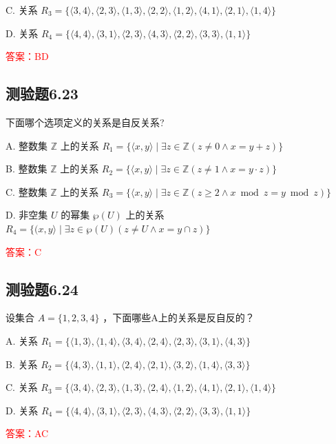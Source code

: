 \documentclass[UTF8, heading=true]{ctexart}
\begin{document}
C. 关系 $R_3=\{\langle 3,4\rangle,\langle 2,3\rangle,\langle 1,3\rangle,\langle 2,2\rangle,\langle 1,2\rangle,\langle 4,1\rangle,\langle 2,1\rangle,\langle 1,4\rangle\}$

D. 关系 $R_4=\{\langle 4,4\rangle,\langle 3,1\rangle,\langle 2,3\rangle,\langle 4,3\rangle,\langle 2,2\rangle,\langle 3,3\rangle,\langle 1,1\rangle\}$

\textcolor{red}{答案：BD}

\subsection{测验题6.23}
下面哪个选项定义的关系是自反关系?

A. 
整数集 $\mathbb{Z}$ 上的关系 $R_1=\{\langle x, y\rangle \mid \exists z \in \mathbb{Z}(z \neq 0 \wedge x=y+z)\}$

B. 
整数集 $\mathbb{Z}$ 上的关系 $R_2=\{\langle x, y\rangle \mid \exists z \in \mathbb{Z}(z \neq 1 \wedge x=y \cdot z)\}$

C. 
整数集 $\mathbb{Z}$ 上的关系 $R_3=\{\langle x, y\rangle \mid \exists z \in \mathbb{Z}(z \geq 2 \wedge x \bmod z=y \bmod z)\}$

D. 
非空集 $U$ 的幂集 $\wp(U)$ 上的关系 $R_4=\{(x, y\rangle \mid \exists z \in \wp(U)(z \neq U \wedge x=y \cap z)\}$

\textcolor{red}{答案：C}

\subsection{测验题6.24}

设集合 $A=\{1,2,3,4\}$ ，下面哪些A上的关系是反自反的？

A. 关系 $R_1=\{\langle 1,3\rangle,\langle 1,4\rangle,\langle 3,4\rangle,\langle 2,4\rangle,\langle 2,3\rangle,\langle 3,1\rangle,\langle 4,3\rangle\}$

B. 关系 $R_2=\{\langle 4,3\rangle,\langle 1,1\rangle,\langle 2,4\rangle,\langle 2,1\rangle,\langle 3,2\rangle,\langle 1,4\rangle,\langle 3,3\rangle\}$

C. 关系 $R_3=\{\langle 3,4\rangle,\langle 2,3\rangle,\langle 1,3\rangle,\langle 2,4\rangle,\langle 1,2\rangle,\langle 4,1\rangle,\langle 2,1\rangle,\langle 1,4\rangle\}$

D. 关系 $R_4=\{\langle 4,4\rangle,\langle 3,1\rangle,\langle 2,3\rangle,\langle 4,3\rangle,\langle 2,2\rangle,\langle 3,3\rangle,\langle 1,1\rangle\}$


\textcolor{red}{答案：AC}
\end{document}
